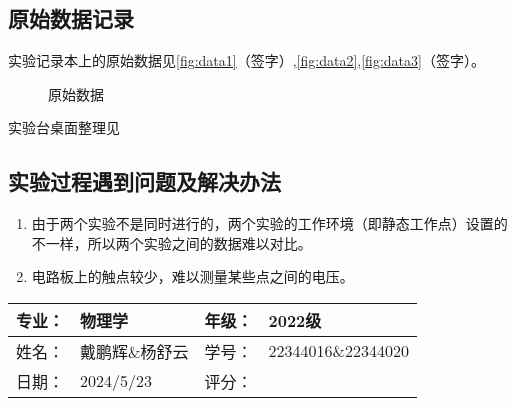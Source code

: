 \documentclass[dvipsnames, svgnames,a4paper,11pt]{article}
\begin{document}
	



	\clearpage
	\subsection{原始数据记录}
	实验记录本上的原始数据见\cref{fig:data1}（签字）,\cref{fig:data2},\cref{fig:data3}（签字）。
		
		
		\begin{figure}[htbp]
			\centering
			\quad
			\quad
			\quad

			\caption{原始数据}
			\label{fig:original_data}
		\end{figure}


	实验台桌面整理见%
	
	
	\subsection{实验过程遇到问题及解决办法}
	\begin{enumerate}
		\item 由于两个实验不是同时进行的，两个实验的工作环境（即静态工作点）设置的不一样，所以两个实验之间的数据难以对比。
		\item 电路板上的触点较少，难以测量某些点之间的电压。
	\end{enumerate}
	
	
	
	\clearpage
	
	\begin{table}
		\renewcommand\arraystretch{1.7}
		\begin{tabularx}{\textwidth}{|X|X|X|X|}
			\hline
			专业：& 物理学 &年级：& 2022级\\
			\hline
			姓名： & 戴鹏辉\&杨舒云 & 学号：& 22344016\&22344020 \\
			\hline
			日期：& 2024/5/23 & 评分： &\\
			\hline
		\end{tabularx}
	\end{table}
	
\end{document}
